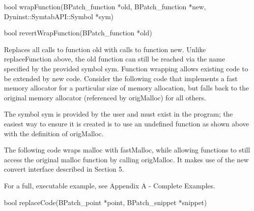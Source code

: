 \begin{apient}
\begin{apient}
bool wrapFunction(BPatch_function *old, BPatch_function *new, Dyninst::SymtabAPI::Symbol *sym)

bool revertWrapFunction(BPatch_function *old)
\end{apient}

\begin{apidesc}
Replaces all calls to function old with calls to function new. Unlike replaceFunction above, the old function can still
be reached via the name specified by the provided symbol sym. Function wrapping allows existing code to be extended by
new code. Consider the following code that implements a fast memory allocator for a particular size of memory
allocation, but falls back to the original memory allocator (referenced by origMalloc) for all others.


The symbol sym is provided by the user and must exist in the program; the easiest way to ensure it is created is to use
an undefined function as shown above with the definition of origMalloc.

The following code wraps malloc with fastMalloc, while allowing functions to still access the original malloc function
by calling origMalloc. It makes use of the new convert interface described in Section 5.


For a full, executable example, see Appendix A - Complete Examples.
\end{apidesc}

\begin{apient}
bool replaceCode(BPatch_point *point, BPatch_snippet *snippet)
\end{apient}


\end{apient}
